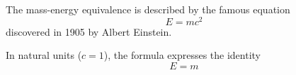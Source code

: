 \documentclass{article}
\begin{document}
	The mass-energy equivalence is described by the famous equation \[E=mc^2\] discovered in 1905 by Albert Einstein.
	
	In natural units ($c = 1$), the formula expresses the identity 
	\begin{equation}
		E=m
	\end{equation}
\end{document}
